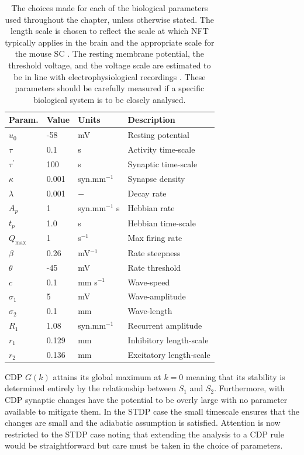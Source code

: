 \begin{table}[h!]
	\centering
	\begin{tabular}[width=0.5\textwidth]{| l || l | l | l |}
		\hline
		Param. & Value & Units  & Description \\
		\hline
		$u_0$ & -58 & mV & Resting potential \\
		$\tau$  & 0.1 & s & Activity time-scale \\
		$\tau^\prime$  & 100 & s & Synaptic time-scale \\
		$\kappa $  & 0.001 & syn.mm$^{-1}$ & Synapse density \\
		$\lambda $  & 0.001 & $-$ & Decay rate\\
		$A_p $  & 1 & syn.mm$^{-1}$  s & Hebbian rate\\
		$t_p $  & 1.0 & s  & Hebbian time-scale\\
		$Q_\text{max} $  & 1 & s$^{-1}$   & Max firing rate\\
		$\beta$ & 0.26 & mV$^{-1}$ & Rate steepness\\
		$\theta$ & -45 & mV & Rate threshold\\
		$c$ & 0.1 & mm s$^{-1}$ & Wave-speed\\
		$\sigma_1$ & 5 & mV & Wave-amplitude\\
		$\sigma_2$ & 0.1 & mm & Wave-length\\
		$R_1$ & 1.08 & syn.mm$^{-1}$ &Recurrent amplitude\\
		$r_1$ & 0.129 & mm &Inhibitory length-scale\\
		$r_2$ & 0.136 & mm &Excitatory length-scale\\
		\hline
	\end{tabular}
	\def\c{Choices for the biological parameters used in a neural field theory model of topographic development. }
	\caption[\c]{\label{table:params} The choices made for each of the biological parameters used throughout the chapter, unless otherwise stated. The length scale is chosen to reflect the scale at which NFT typically applies in the brain and the appropriate scale for the mouse SC \cite{Robinson2005-en}. The resting membrane potential, the threshold voltage, and the voltage scale are estimated to be in line with electrophysiological recordings \cite{Shi2018-er}. These parameters should be carefully measured if a specific biological system is to be closely analysed. \label{table:parameters}}
\end{table}

CDP $G(k)$ attains its global maximum at $k=0$ meaning that its stability is determined entirely by the relationship between $S_1$ and $S_2$. Furthermore, with CDP synaptic changes have the potential to be overly large with no parameter available to mitigate them. In the STDP case the small timescale ensures that the changes are small and the adiabatic assumption is satisfied. Attention is now restricted to the STDP case noting that extending the analysis to a CDP rule would be straightforward but care must be taken in the choice of parameters.

